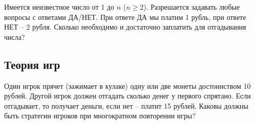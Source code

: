  \begin{problem} 
Имеется неизвестное число от 1 до $n$ ($n\ge 2$). Разрешается задавать любые вопросы с ответами ДА/НЕТ. При ответе ДА мы платим 1 рубль, при ответе НЕТ -- 2 рубля. Сколько необходимо и достаточно заплатить для отгадывания числа?
\end{problem}

\subsection{Теория игр}
\begin{problem}
Один игрок прячет (зажимает в кулаке) одну или две монеты достоинством 10 рублей. Другой игрок должен отгадать сколько денег у первого спрятано. Если отгадывает, то получает деньги, если нет -- платит 15 рублей. Каковы  должны быть стратегии игроков при многократном повторении игры?

\end{problem}


\begin{comment}
\begin{problem}
Некто обладает одной облигацией, которую намеревается продать в один из последующих четырех дней, в которых цена облигации 
принимает различные значения, априори неизвестные, но становящиеся известными в начале каждого дня продаж. Предполагается, что 
цены облигации независимы и их перестановки по торговым дням равновозможны. Какова стратегия продавца, состоящая в выборе дня 
продажи облигации и гарантирующая максимальную вероятность того, что он продаст облигацию в день ее наибольшей цены? 
\end{problem}

\begin{ordre}
Рассмотреть следующие возможные стратегии и сравнить вероятности продажи облигации в день наибольшей цены: 
\begin{enumerate}
\item[а)] на первом шаге (в первый день торгов) запомним имевшую место цену облигации, не продавая ее, а затем продадим 
облигацию в тот день, когда ее цена окажется большей цены, зафиксированной в первый день, или (когда такого дня не окажется) в 
последний (четвертый) день, независимо от цены этого дня (стратегия $S_1$); 

\item[б)] не продавая облигацию в первом и втором торговых днях, зафиксируем  максимальную цену из двух, имевших место для этих дней, 
и продадим облигацию в третьем торговом дне, если цена облигации в нем будет выше, чем указанная зафиксированная максимальная цена, 
или, в противном случае, в четвертом дне (стратегия $S_2$). 
\end{enumerate}
\end{ordre}
\end{comment}

